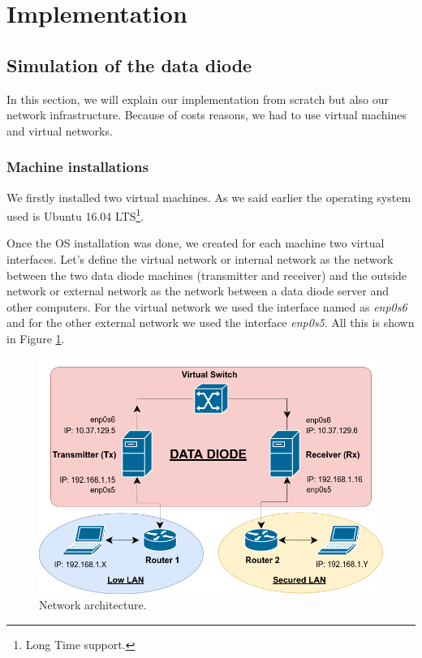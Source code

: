 \documentclass[a4paper,10pt]{article}
\begin{document}
\section{Implementation}
\subsection{Simulation of the data diode}
In this section, we will explain our implementation from scratch but also our network infrastructure. Because of costs reasons, we had to use virtual machines and virtual networks. 

\subsubsection{Machine installations}
We firstly installed two virtual machines. As we said earlier the operating system used is Ubuntu 16.04 LTS\footnote{Long Time support.}. 

Once the OS installation was done, we created for each machine two virtual interfaces. Let's define the virtual network or internal network as the network between the two data diode machines (transmitter and receiver) and the outside network or external network as the network between a data diode server and other computers. For the virtual network we used the interface named as \emph{enp0s6} and for the other external network we used the interface \emph{enp0s5}. All this is shown in Figure \ref{fig:netvirt}.

\begin{figure}[!h]
\centering
\includegraphics[scale=0.5]{images/schema2.png}
\caption{Network architecture.}
\label{fig:netvirt}
\end{figure}
\end{document}
